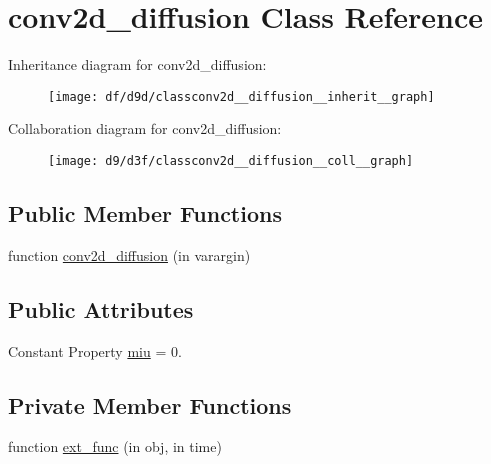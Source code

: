 \hypertarget{classconv2d__diffusion}{}\section{conv2d\+\_\+diffusion Class Reference}
\label{classconv2d__diffusion}


Inheritance diagram for conv2d\+\_\+diffusion\+:
\nopagebreak
\begin{figure}[H]
\begin{center}
\leavevmode
\texttt{[image: df/d9d/classconv2d\_\_diffusion\_\_inherit\_\_graph]}
\end{center}
\end{figure}


Collaboration diagram for conv2d\+\_\+diffusion\+:
\nopagebreak
\begin{figure}[H]
\begin{center}
\leavevmode
\texttt{[image: d9/d3f/classconv2d\_\_diffusion\_\_coll\_\_graph]}
\end{center}
\end{figure}
\subsection*{Public Member Functions}
\begin{DoxyCompactItemize}
\item 
function \hyperlink{classconv2d__diffusion_a8c9828aaa5100c1d3840086df0db40c0}{conv2d\+\_\+diffusion} (in varargin)
\end{DoxyCompactItemize}
\subsection*{Public Attributes}
\begin{DoxyCompactItemize}
\item 
Constant Property \hyperlink{classconv2d__diffusion_add29da5c3b7d3836fb3ee9ddabd23f83}{miu} = 0.
\end{DoxyCompactItemize}
\subsection*{Private Member Functions}
\begin{DoxyCompactItemize}
\item 
function \hyperlink{classconv2d__diffusion_a193de0e494c2fb11dafce56b74c8d72e}{ext\+\_\+func} (in obj, in time)
\end{DoxyCompactItemize}
